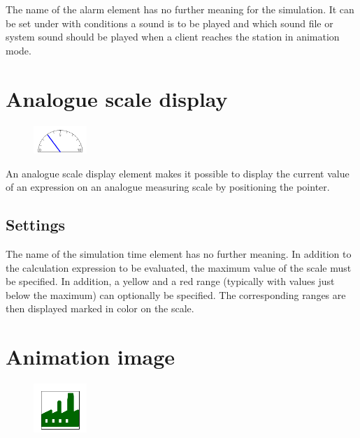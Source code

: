 The name of the alarm element has no further meaning for the simulation.
It can be set under with conditions a sound is to be played and
which sound file or system sound should be played when a client
reaches the station in animation mode.


\section{Analogue scale display}
\label{ref:ModelElementAnimationPointerMeasuring}

\begin{figure}
\vspace{-22pt}
\includegraphics[width=2cm]{imageModelElementAnimationPointerMeasuring.png}
\vspace{-22pt}
\end{figure}

An analogue scale display element makes it possible to display the current
value of an expression on an analogue measuring scale by positioning the pointer.

\subsection*{Settings}

The name of the simulation time element has no further meaning.
In addition to the calculation expression to be evaluated,
the maximum value of the scale must be specified. In addition,
a yellow and a red range (typically with values just below
the maximum) can optionally be specified. The corresponding
ranges are then displayed marked in color on the scale.


\section{Animation image}
\label{ref:ModelElementAnimationImage}

\begin{figure}
\vspace{-22pt}
\includegraphics[width=2cm]{imageModelElementAnimationImage.png}
\vspace{-22pt}
\end{figure}

